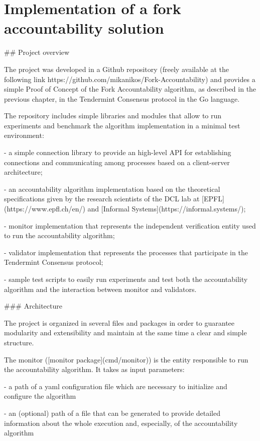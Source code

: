 \documentclass[a4paper,11pt,oneside]{report}
\begin{document}
\chapter{Implementation of a fork accountability solution}

\begin{markdown}

## Project overview

The project was developed in a Github repository (freely available at the following link https://github.com/mikanikos/Fork-Accountability) and provides a simple Proof of Concept of the Fork Accountability algorithm, as described in the previous chapter, in the Tendermint Consensus protocol in the Go language.

The repository includes simple libraries and modules that allow to run experiments and benchmark the algorithm implementation in a minimal test environment:

- a simple connection library to provide an high-level API for establishing connections and communicating among processes based on a client-server architecture; 

- an accountability algorithm implementation based on the theoretical specifications given by the research scientists of the DCL lab at [EPFL](https://www.epfl.ch/en/) and [Informal Systems](https://informal.systems/);  

- monitor implementation that represents the independent verification entity used to run the accountability algorithm;  

- validator implementation that represents the processes that participate in the Tendermint Consensus protocol; 

- sample test scripts to easily run experiments and test both the accountability algorithm and the interaction between monitor and validators.

### Architecture

The project is organized in several files and packages in order to guarantee modularity and extensibility and maintain at the same time a clear and simple structure.

The monitor ([monitor package](cmd/monitor)) is the entity responsible to run the accountability algorithm. It takes as input parameters:

- a path of a yaml configuration file which are necessary to initialize and configure the algorithm

- an (optional) path of a file that can be generated to provide detailed information about the whole execution and, especially, of the accountability algorithm


\end{markdown}
\end{document}
